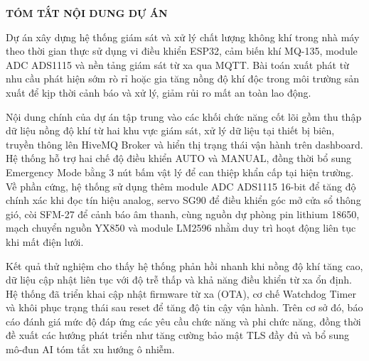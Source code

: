 \documentclass[../BTL_PTIT.tex]{subfiles}
\begin{document}
\begin{center}
    \Large{\textbf{TÓM TẮT NỘI DUNG DỰ ÁN}}\\
\end{center}
\vspace{1cm}
\hspace*{15pt}Dự án xây dựng hệ thống giám sát và xử lý chất lượng không khí trong nhà máy theo thời gian thực sử dụng vi điều khiển ESP32, cảm biến khí MQ-135, module ADC ADS1115 và nền tảng giám sát từ xa qua MQTT. Bài toán xuất phát từ nhu cầu phát hiện sớm rò rỉ hoặc gia tăng nồng độ khí độc trong môi trường sản xuất để kịp thời cảnh báo và xử lý, giảm rủi ro mất an toàn lao động.

Nội dung chính của dự án tập trung vào các khối chức năng cốt lõi gồm thu thập dữ liệu nồng độ khí từ hai khu vực giám sát, xử lý dữ liệu tại thiết bị biên, truyền thông lên HiveMQ Broker và hiển thị trạng thái vận hành trên dashboard. Hệ thống hỗ trợ hai chế độ điều khiển AUTO và MANUAL, đồng thời bổ sung Emergency Mode bằng 3 nút bấm vật lý để can thiệp khẩn cấp tại hiện trường. Về phần cứng, hệ thống sử dụng thêm module ADC ADS1115 16-bit để tăng độ chính xác khi đọc tín hiệu analog, servo SG90 để điều khiển góc mở cửa sổ thông gió, còi SFM-27 để cảnh báo âm thanh, cùng nguồn dự phòng pin lithium 18650, mạch chuyển nguồn YX850 và module LM2596 nhằm duy trì hoạt động liên tục khi mất điện lưới.

Kết quả thử nghiệm cho thấy hệ thống phản hồi nhanh khi nồng độ khí tăng cao, dữ liệu cập nhật liên tục với độ trễ thấp và khả năng điều khiển từ xa ổn định. Hệ thống đã triển khai cập nhật firmware từ xa (OTA), cơ chế Watchdog Timer và khôi phục trạng thái sau reset để tăng độ tin cậy vận hành. Trên cơ sở đó, báo cáo đánh giá mức độ đáp ứng các yêu cầu chức năng và phi chức năng, đồng thời đề xuất các hướng phát triển như tăng cường bảo mật TLS đầy đủ và bổ sung mô-đun AI tóm tắt xu hướng ô nhiễm.
\end{document}
